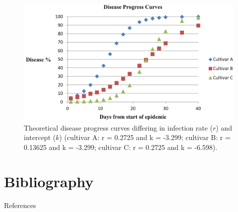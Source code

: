 \documentclass[11pt,dvipsnames,ignorenonframetext,aspectratio=169]{beamer}
\newif\ifbibliography
\begin{document}
\begin{frame}{}
\protect\hypertarget{section-6}{}
\begin{figure}
\includegraphics[width=0.8\linewidth]{../images/audpc_curve_john_bradshaw} \caption{Theoretical disease progress curves differing in infection rate ($r$) and intercept ($k$) (cultivar A: r = 0.2725 and k = -3.299; cultivar B: r = 0.13625 and k = -3.299; cultivar C: r = 0.2725 and k = -6.598).}\label{fig:audpc-theoretical}
\end{figure}
\end{frame}

\hypertarget{bibliography}{%
\section{Bibliography}\label{bibliography}}

\begin{frame}{References}
\protect\hypertarget{references}{}
\end{frame}

          \begin{frame}[allowframebreaks]{}
    \bibliographytrue
    
    \end{frame}
  
\end{document}
